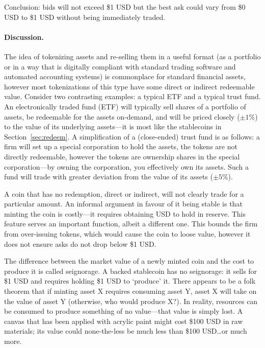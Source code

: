 Conclusion: bids will not exceed \$1 USD but the best ask could vary from \$0 USD to \$1 USD without being immediately traded.

\paragraph{Discussion.} The idea of tokenizing assets and re-selling them in a useful format (\eg as a portfolio or in a way that is digitally compliant with standard trading software and automated accounting systems) is commonplace for standard financial assets, however most tokenizations of this type have some direct or indirect redeemable value. Consider two contrasting examples: a typical ETF and a typical trust fund. An electronically traded fund (ETF) will typically sell shares of a portfolio of assets, be redeemable for the assets on-demand, and will be priced closely ($\pm 1\%$) to the value of its underlying assets---it is most like the stablecoins in Section~\ref{sec:redeem}. A simplification of a (close-ended) trust fund is as follows: a firm will set up a special corporation to hold the assets, the tokens are not directly redeemable, however the tokens are ownership shares in the special corporation---by owning the corporation, you effectively own its assets. Such a fund will trade with greater deviation from the value of its assets ($\pm 5\%$).


A coin that has no redemption, direct or indirect, will not clearly trade for a particular amount. An informal argument in favour of it being stable is that minting the coin is costly---it requires obtaining USD to hold in reserve. This feature serves an important function, albeit a different one. This bounds the firm from over-issuing tokens, which would cause the coin to loose value, however it does not ensure asks do not drop below \$1 USD.

The difference between the market value of a newly minted coin and the cost to produce it is called seignorage. A backed stablecoin has no seignorage: it sells for \$1 USD and requires holding \$1 USD to `produce' it. There appears to be a folk theorem that if minting asset X requires consuming asset Y, asset X will take on the value of asset Y (otherwise, who would produce X?). In reality, resources can be consumed to produce something of no value---that value is simply lost. A canvas that has been applied with acrylic paint might cost \$100 USD in raw materials; its value could none-the-less be much less than \$100 USD\ldots or much more.

